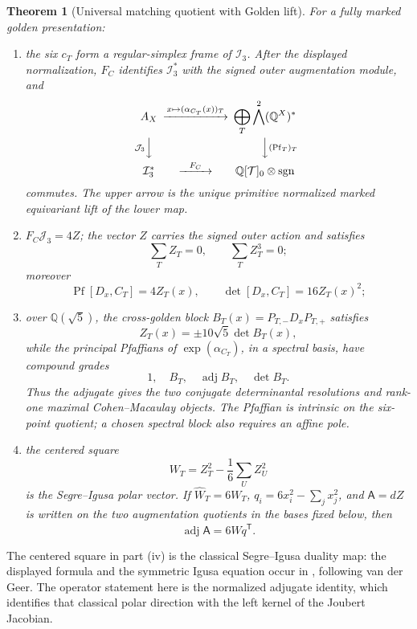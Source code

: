 \documentclass[11pt]{article}
\newtheorem{theorem}{Theorem}[section]
\theoremstyle{definition}
\theoremstyle{remark}
\newcommand{\cT}{\mathcal T}
\newcommand{\Pf}{\operatorname{Pf}}
\begin{document}
\begin{theorem}[Universal matching quotient with Golden lift]
\label{thm:propagation}
For a fully marked golden presentation:
\begin{enumerate}[label=\textup{(\roman*)},leftmargin=*]
\item the six \(c_T\) form a regular-simplex frame of \(\mathcal I_3\).
  After the displayed normalization, \(F_C\) identifies
  \(\mathcal I_3^*\) with the signed outer augmentation module, and
  \[
  \begin{CD}
   A_X @>{x\mapsto(\alpha_{C_T}(x))_T}>>
      \displaystyle\bigoplus_T\bigwedge^2(\mathbb Q^X)^*\\
   @V{\mathcal J_3}VV @VV{(\Pf_T)_T}V\\
   \mathcal I_3^* @>{F_C}>> \mathbb Q[\cT]_0\otimes\operatorname{sgn}
  \end{CD}
  \]
  commutes.  The upper arrow is the unique primitive normalized marked
  equivariant lift of the lower map.
\item \(F_C\mathcal J_3=4Z\); the vector \(Z\) carries the signed outer
  action and satisfies
  \[
    \sum_T Z_T=0,\qquad \sum_T Z_T^3=0;
  \]
  moreover
  \[
    \Pf[D_x,C_T]=4Z_T(x),\qquad
    \det[D_x,C_T]=16Z_T(x)^2;
  \]
\item over \(\mathbb Q(\sqrt5)\), the cross-golden block
  \(B_T(x)=P_{T,-}D_xP_{T,+}\) satisfies
  \[
    Z_T(x)=\pm10\sqrt5\det B_T(x),
  \]
  while the principal Pfaffians of \(\exp(\alpha_{C_T})\), in a spectral
  basis, have compound grades
  \[
    1,\quad B_T,\quad\operatorname{adj}B_T,\quad\det B_T.
  \]
  Thus the adjugate gives the two conjugate determinantal resolutions and
  rank-one maximal Cohen--Macaulay objects.  The Pfaffian is intrinsic on
  the six-point quotient; a chosen spectral block also requires an affine
  pole.
\item the centered square
  \[
    W_T=Z_T^2-\frac16\sum_U Z_U^2
  \]
  is the Segre--Igusa polar vector.  If
  \(\widehat W_T=6W_T\),
  \(q_i=6x_i^2-\sum_jx_j^2\), and \(\mathsf A=dZ\) is written on the
  two augmentation quotients in the bases fixed below, then
  \[
    \operatorname{adj}\mathsf A=6\widehat Wq^{\mathsf T}.
  \]
\end{enumerate}
\end{theorem}

The centered square in part (iv) is the classical Segre--Igusa duality
map: the displayed formula and the symmetric Igusa equation occur in
\cite[Section~2.2]{HMSVOuter}, following van der Geer.  The operator
statement here is the normalized adjugate identity, which identifies that
classical polar direction with the left kernel of the Joubert Jacobian.
\end{document}
